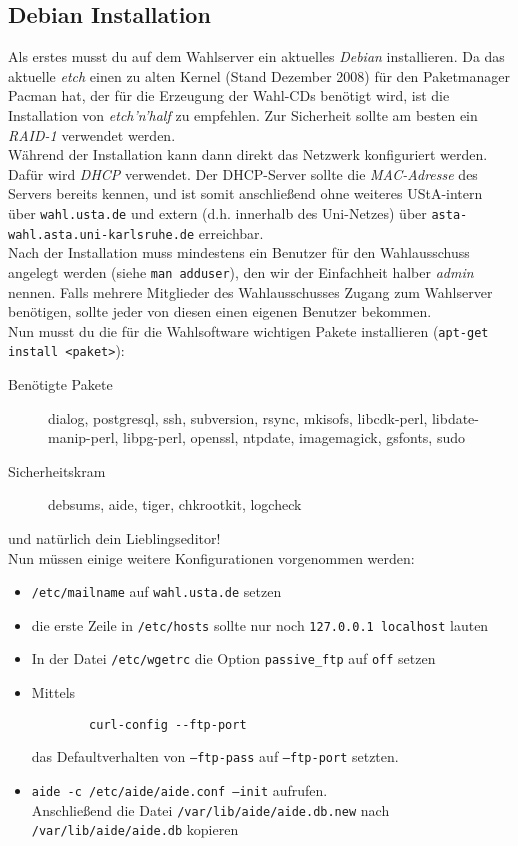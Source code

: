 \documentclass[a4paper,10pt]{article}
\begin{document}
\subsection{Debian Installation}
Als erstes musst du auf dem Wahlserver ein aktuelles \textit{Debian} installieren. Da das aktuelle \textit{etch} einen zu alten Kernel (Stand Dezember 2008) für den Paketmanager Pacman hat, der für die Erzeugung der Wahl-CDs benötigt wird, ist die Installation von \textit{etch'n'half} zu empfehlen. Zur Sicherheit sollte am besten ein \textit{RAID-1} verwendet werden. \\
Während der Installation kann dann direkt das Netzwerk konfiguriert werden. Dafür wird \textit{DHCP} verwendet. Der DHCP-Server sollte die \textit{MAC-Adresse} des Servers bereits kennen, und ist somit anschließend ohne weiteres UStA-intern über \texttt{wahl.usta.de} und extern (d.h. innerhalb des Uni-Netzes) über \texttt{asta-wahl.asta.uni-karlsruhe.de} erreichbar. \\
Nach der Installation muss mindestens ein Benutzer für den Wahlausschuss angelegt werden (siehe \texttt{man adduser}), den wir der Einfachheit halber \textit{admin} nennen. Falls mehrere Mitglieder des Wahlausschusses Zugang zum Wahlserver benötigen, sollte jeder von diesen einen eigenen Benutzer bekommen. \\
Nun musst du die für die Wahlsoftware wichtigen Pakete installieren (\texttt{apt-get install <paket>}):
\begin{description}
	\item[Benötigte Pakete] dialog, postgresql, ssh, subversion, rsync, mkisofs, libcdk-perl, libdate-manip-perl, libpg-perl, openssl, ntpdate, imagemagick, gsfonts, sudo
	\item[Sicherheitskram] debsums, aide, tiger, chkrootkit, logcheck
 \end{description}
und natürlich dein Lieblingseditor!
\vspace{8pt} \\
Nun müssen einige weitere Konfigurationen vorgenommen werden:
\begin{itemize}
	\item \texttt{/etc/mailname} auf \texttt{wahl.usta.de} setzen
	\item die erste Zeile in \texttt{/etc/hosts} sollte nur noch
		\texttt{127.0.0.1 localhost} lauten
	\item In der Datei \texttt{/etc/wgetrc} die Option \texttt{passive\_ftp} auf
		\texttt{off} setzen
	\item Mittels 
	\begin{verbatim}
		curl-config --ftp-port
	\end{verbatim} das Defaultverhalten von \texttt{--ftp-pass} auf \texttt{--ftp-port} setzten.
	\item \texttt{aide -c /etc/aide/aide.conf --init} aufrufen. \\
		Anschließend die Datei \texttt{/var/lib/aide/aide.db.new} nach
		\texttt{/var/lib/aide/aide.db} kopieren
\end{itemize}
\end{document}

